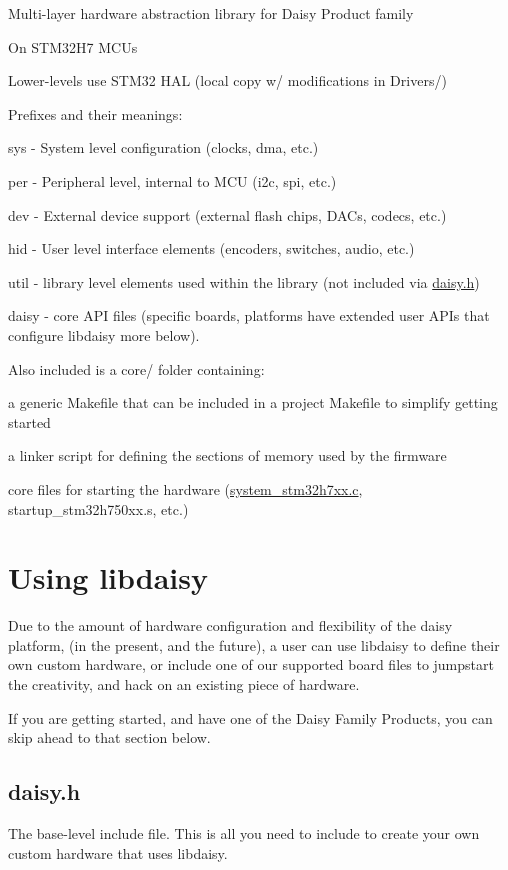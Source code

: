 Multi-\/layer hardware abstraction library for Daisy Product family

On S\+T\+M32\+H7 M\+C\+Us

Lower-\/levels use S\+T\+M32 H\+AL (local copy w/ modifications in Drivers/)

Prefixes and their meanings\+:


\begin{DoxyItemize}
\item sys -\/ System level configuration (clocks, dma, etc.)
\item per -\/ Peripheral level, internal to M\+CU (i2c, spi, etc.)
\item dev -\/ External device support (external flash chips, D\+A\+Cs, codecs, etc.)
\item hid -\/ User level interface elements (encoders, switches, audio, etc.)
\item util -\/ library level elements used within the library (not included via \hyperlink{daisy_8h_source}{daisy.\+h})
\item daisy -\/ core A\+PI files (specific boards, platforms have extended user A\+P\+Is that configure libdaisy more below).
\end{DoxyItemize}

Also included is a core/ folder containing\+:


\begin{DoxyItemize}
\item a generic Makefile that can be included in a project Makefile to simplify getting started
\item a linker script for defining the sections of memory used by the firmware
\item core files for starting the hardware (\hyperlink{system__stm32h7xx_8c}{system\+\_\+stm32h7xx.\+c}, startup\+\_\+stm32h750xx.\+s, etc.) 


\end{DoxyItemize}\hypertarget{index_autotoc_md3}{}\section{Using libdaisy}\label{index_autotoc_md3}
Due to the amount of hardware configuration and flexibility of the daisy platform, (in the present, and the future), a user can use libdaisy to define their own custom hardware, or include one of our supported board files to jumpstart the creativity, and hack on an existing piece of hardware.

If you are getting started, and have one of the Daisy Family Products, you can skip ahead to that section below.\hypertarget{index_autotoc_md4}{}\subsection{daisy.\+h}\label{index_autotoc_md4}
The base-\/level include file. This is all you need to include to create your own custom hardware that uses libdaisy.

